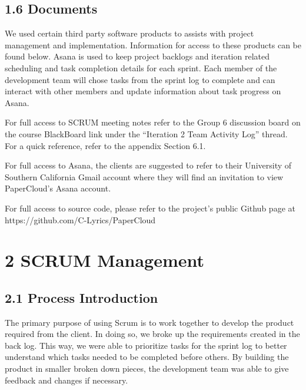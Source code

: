 \documentclass[]{article}
\begin{document}
\subsection{1.6 Documents}\label{documents}

We used certain third party software products to assists with project
management and implementation. Information for access to these products
can be found below. Asana is used to keep project backlogs and iteration
related scheduling and task completion details for each sprint. Each
member of the development team will chose tasks from the sprint log to
complete and can interact with other members and update information
about task progress on Asana.

For full access to SCRUM meeting notes refer to the Group 6 discussion
board on the course BlackBoard link under the ``Iteration 2 Team
Activity Log'' thread. For a quick reference, refer to the appendix
Section 6.1.

For full access to Asana, the clients are suggested to refer to their
University of Southern California Gmail account where they will find an
invitation to view PaperCloud's Asana account.

For full access to source code, please refer to the project's public
Github page at https://github.com/C-Lyrics/PaperCloud

\section{2 SCRUM Management}\label{scrum-management}

\subsection{2.1 Process Introduction}\label{process-introduction}

The primary purpose of using Scrum is to work together to develop the
product required from the client. In doing so, we broke up the
requirements created in the back log. This way, we were able to
prioritize tasks for the sprint log to better understand which tasks
needed to be completed before others. By building the product in smaller
broken down pieces, the development team was able to give feedback and
changes if necessary.
\end{document}

